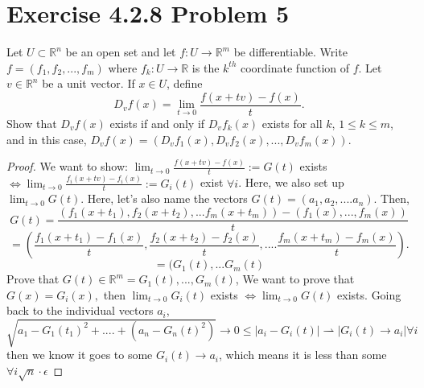 \documentclass{article}
\begin{document}
\section*{Exercise 4.2.8 Problem 5}
Let $U \subset \mathbb{R}^n$ be an open set and let $f : U \rightarrow \mathbb{R}^m$ be differentiable. Write $f = (f_1, f_2, . . . , f_m)$ where $f_k : U \rightarrow \mathbb{R}$ is the $k^{th}$ coordinate function of $f$. Let $v \in \mathbb{R}^n$ be a unit vector. If $x \in U $, define
$$D_vf (x) = \lim_{t \rightarrow 0}\frac{f(x+tv)-f(x)}{t}. $$
Show that $D_vf (x)$ exists if and only if $D_vf_k(x)$ exists for all $k$, $1 \leq k \leq m$, and in this case, $D_vf (x) = (D_vf_1(x), D_vf_2(x), . . . , D_vf_m(x))$. \\ 
\begin{proof}
    We want to show: $\lim_{t \rightarrow 0}\frac{f(x+tv)-f(x)}{t} := G(t) $ exists $\iff \lim_{t \rightarrow 0}\frac{f_i(x+tv)-f_i(x)}{t} := G_i(t)$ exist $\forall i$. Here, we also set up $\lim_{t \rightarrow 0}G(t)$. Here, let's also name the vectors $G(t)=(a_1,a_2,....a_n)$. Then, $$G(t) = \frac{(f_1(x+t_1), f_2(x+t_2),...f_m(x+t_m))-(f_1(x),...,f_m(x))}{t}$$
    $$=(\frac{f_1(x+t_1)-f_1(x)}{t},\frac{f_2(x+t_2)-f_2(x)}{t},....\frac{f_m(x+t_m)-f_m(x)}{t}).$$ 
    $$ = (G_1(t), ...G_m(t)$$
    Prove that $G(t) \in \mathbb{R}^m = G_1(t),...,G_m(t)$, 
    We want to prove that $G(x)=G_i(x),$ then $\lim_{t \rightarrow 0} G_i(t)$ exists $\iff \lim_{t \rightarrow 0} G(t)$ exists. Going back to the individual vectors $a_i$, 
    $\sqrt{a_1-G_1(t_1)^2+....+(a_n-G_n(t)^2)} \rightarrow 0 \leq  |a_i-G_i(t)| \rightharpoonup |G_i(t)\rightarrow a_i| \forall i$  then we know it goes to some $ G_i(t) \rightarrow a_i$, which means it is less than some $\forall i \sqrt{n}\cdot \epsilon$
\end{proof}
\end{document}
